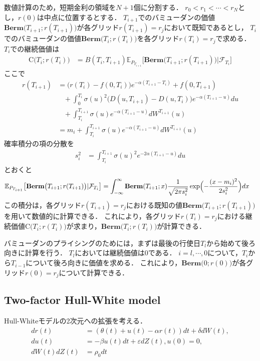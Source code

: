 \documentclass[11pt,a4paper]{jsarticle}
\newcommand{\E}{\mathbb{E}}
\newcommand{\Berm}{\textbf{Berm}}
\begin{document}
数値計算のため，短期金利の領域を$N + 1$個に分割する．
$r_0 < r_1 < \cdots < r_N$とし，$r(0)$は中点に位置するとする．
$T_{i+1}$でのバミューダンの価値$\Berm \bigl(T_{i+1}; r(T_{i+1}) \bigr)$が各グリッド$r(T_{i+1}) = r_j$において既知であるとし，
$T_i$でのバミューダンの価値$\Berm \bigl(T_i; r(T_i) \bigr)$を各グリッド$r(T_i) = r_j$で求める．
$T_i$での継続価値は
\begin{align}
\mathrm{C} \bigl( T_i; r(T_i) \bigr)
& =
B(T_i, T_{i+1}) \E_{P_{T_{i+1}}} \bigl[ \Berm \bigl( T_{i+1}; r(T_{i+1}) \bigr) | \mathcal{F}_{T_i} \bigr] \nonumber
\end{align}
ここで
\begin{align}
r(T_{i+1})
& =
\bigl( r(T_i) - f(0, T_i) \bigr) e^{-\alpha (T_{i+1} - T_i)} + f(0, T_{i+1}) \nonumber \\
& \hspace{10pt}
+ \int_0^{T_i} \sigma(u)^2 \bigl( D(u, T_{i+1}) - D(u, T_i) \bigr) e^{-\alpha (T_{i+1} - u)} du \nonumber \\
& \hspace{10pt}
+ \int_{T_i}^{T_{i+1}} \sigma(u) e^{-\alpha (T_{i+1} - u)} d W^{T_{i+1}} (u) \nonumber \\
& =
m_i + \int_{T_i}^{T_{i+1}} \sigma(u) e^{-\alpha (T_{i+1} - u)} d W^{T_{i+1}} (u) \nonumber
\end{align}
確率積分の項の分散を
\begin{align}
s_i^2
& =
\int_{T_i}^{T_{i+1}} \sigma(u)^2 e^{-2\alpha (T_{i+1} - u)} du \nonumber
\end{align}
とおくと
\begin{align}
\E_{P_{T_{i+1}}} \bigl[ \Berm \bigl( T_{i+1}; r(T_{i+1}) \bigr) | \mathcal{F}_{T_i} \bigr]
& =
\int_{-\infty}^{\infty} \Berm(T_{i+1}; x) \frac{1}{\sqrt{2 \pi s_i^2}} \exp \Bigl(- \frac{(x - m_i)^2}{2 s_i^2} \Bigr) dx \nonumber
\end{align}
この積分は，各グリッド$r(T_{i+1}) = r_j$における既知の値$\Berm \bigl(T_{i+1}; r(T_{i+1}) \bigr)$を用いて数値的に計算できる．
これにより，各グリッド$r(T_i) = r_j$における継続価値$\mathrm{C} \bigl(T_i; r(T_i) \bigr)$が求まり，$\Berm \bigl(T_i; r(T_i) \bigr)$が計算できる．

バミューダンのプライシングのためには，まずは最後の行使日$T_l$から始めて後ろ向きに計算を行う．
$T_l$においては継続価値は0である．
$i = l, \cdots, 0$について，$T_i$から$T_{i-1}$について後ろ向きに価値を求める．
これにより，$\Berm \bigl(0; r(0) \bigr)$が各グリッド$r(0) = r_j$について計算できる．

\subsection{Two-factor Hull-White model}
Hull-Whiteモデルの2次元への拡張を考える．
\begin{align}
dr(t)
& =
(\theta(t) + u(t) - \alpha r(t)) dt + \delta dW(t), \nonumber \\
du(t)
& =
-\beta u(t) dt + \varepsilon dZ(t), u(0) = 0, \nonumber \\
dW(t) dZ(t)
& =
\rho_0 dt \nonumber
\end{align}
\end{document}
